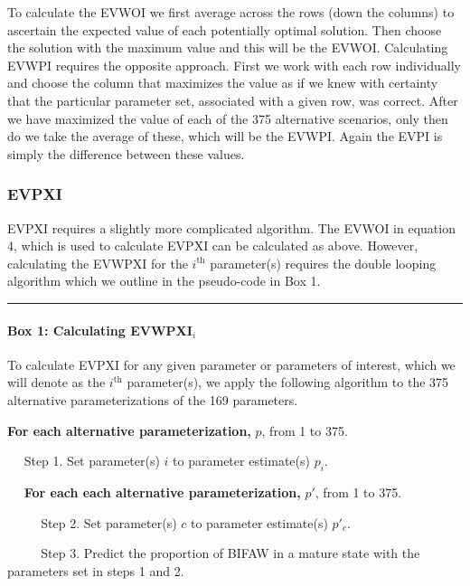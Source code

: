 \documentclass[draft]{article}
\theoremstyle{definition}
\theoremstyle{definition}
\theoremstyle{definition}
\theoremstyle{remark}
\begin{document}
To calculate the EVWOI we first average across the rows (down the
columns) to ascertain the expected value of each potentially optimal
solution. Then choose the solution with the maximum value and this will
be the EVWOI. Calculating EVWPI requires the opposite approach. First we
work with each row individually and choose the column that maximizes the
value as if we knew with certainty that the particular parameter set,
associated with a given row, was correct. After we have maximized the
value of each of the 375 alternative scenarios, only then do we take the
average of these, which will be the EVWPI. Again the EVPI is simply the
difference between these values.

\subsubsection*{EVPXI}\label{evpxi}

EVPXI requires a slightly more complicated algorithm. The EVWOI in
equation 4, which is used to calculate EVPXI can be calculated as above.
However, calculating the EVWPXI for the \(i^\mathrm{th}\) parameter(s)
requires the double looping algorithm which we outline in the
pseudo-code in Box 1.

\begin{center}\rule{0.5\linewidth}{\linethickness}\end{center}

\paragraph{\texorpdfstring{Box 1: Calculating
EVWPXI\(_i\)}{Box 1: Calculating EVWPXI\_i}}\label{box-1-calculating-evwpxi_i}

To calculate EVPXI for any given parameter or parameters of interest,
which we will denote as the \(i^\mathrm{th}\) parameter(s), we apply the
following algorithm to the 375 alternative parameterizations of the 169
parameters.

\textbf{For each alternative parameterization,} \(p\), from 1 to 375.

\(\quad\) Step 1. Set parameter(s) \(i\) to parameter estimate(s)
\(p_i\).

\(\quad\) \textbf{For each each alternative parameterization,} \(p'\),
from 1 to 375.

\(\quad\) \(\quad\) Step 2. Set parameter(s) \(c\) to parameter
estimate(s) \(p'_c\).

\(\quad\) \(\quad\) Step 3. Predict the proportion of BIFAW in a mature
state with the parameters set in steps 1 and 2.
\end{document}

